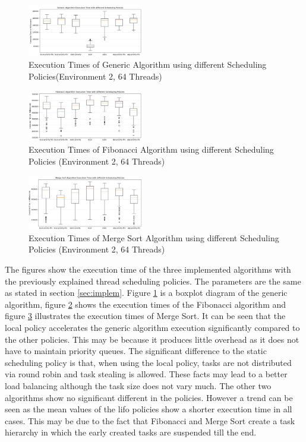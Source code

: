 \begin{figure}[h]
	\centering
	\includegraphics[width=0.45\textwidth]{figures/genSchedule.JPG}
	\caption{Execution Times of Generic Algorithm using different Scheduling Policies(Environment 2, 64 Threads)}
	\label{fig:gen_Schedule}
\end{figure}
\begin{figure}[h]
	\centering
	\includegraphics[width=0.45\textwidth]{figures/fibSchedule.JPG}
	\caption{Execution Times of Fibonacci Algorithm using different Scheduling Policies (Environment 2, 64 Threads)}
	\label{fig:fib_Schedule}
\end{figure}
\begin{figure}[h]
	\centering
	\includegraphics[width=0.45\textwidth]{figures/sortSchedule.JPG}
	\caption{Execution Times of Merge Sort Algorithm using different Scheduling Policies (Environment 2, 64 Threads)}
	\label{fig:sort_Schedule}
\end{figure}

The figures show the execution time of the three implemented algorithms with the previously explained thread scheduling policies.
The parameters are the same as stated in section \ref{sec:implem}.
Figure \ref{fig:gen_Schedule} is a boxplot diagram of the generic algorithm, figure \ref{fig:fib_Schedule} shows the execution times of the Fibonacci algorithm and figure \ref{fig:sort_Schedule} illustrates the execution times of Merge Sort.
It can be seen that the local policy accelerates the generic algorithm execution significantly compared to the other policies.
This may be because it produces little overhead as it does not have to maintain priority queues.
The significant difference to the static scheduling policy is that, when using the local policy, tasks are not distributed via round robin and task stealing is allowed.
These facts may lead to a better load balancing although the task size does not vary much.
The other two algorithms show no significant different in the policies.
However a trend can be seen as the mean values of the lifo policies show a shorter execution time in all cases.
This may be due to the fact that Fibonacci and Merge Sort create a task hierarchy in which the early created tasks are suspended till the end.

